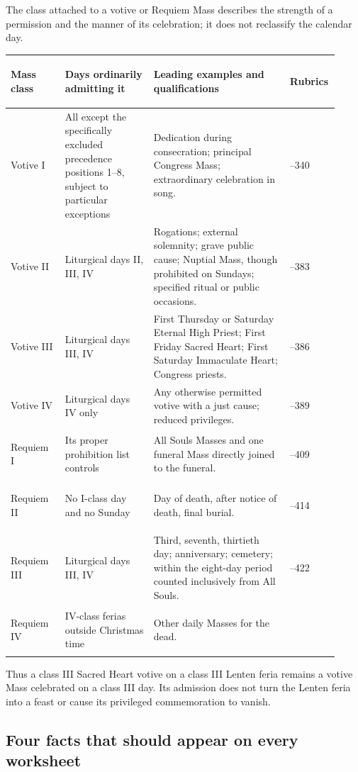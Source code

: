 The class attached to a votive or Requiem Mass describes the strength of a permission and the manner of its celebration; it does not reclassify the calendar day.

\begin{longtable}{>{\bfseries\raggedright\arraybackslash}p{0.16\linewidth}>{\raggedright\arraybackslash}p{0.26\linewidth}>{\raggedright\arraybackslash}p{0.40\linewidth}>{\raggedright\arraybackslash}p{0.10\linewidth}}
\toprule
Mass class & Days ordinarily admitting it & Leading examples and qualifications & Rubrics\\
\midrule
\endhead
Votive I & All except the specifically excluded precedence positions 1--8, subject to particular exceptions & Dedication during consecration; principal Congress Mass; extraordinary celebration in song. & 328--340\\
Votive II & Liturgical days II, III, IV & Rogations; external solemnity; grave public cause; Nuptial Mass, though prohibited on Sundays; specified ritual or public occasions. & 341--383\\
Votive III & Liturgical days III, IV & First Thursday or Saturday Eternal High Priest; First Friday Sacred Heart; First Saturday Immaculate Heart; Congress priests. & 384--386\\
Votive IV & Liturgical days IV only & Any otherwise permitted votive with a just cause; reduced privileges. & 387--389\\
Requiem I & Its proper prohibition list controls & All Souls Masses and one funeral Mass directly joined to the funeral. & 402--409\\
Requiem II & No I-class day and no Sunday & Day of death, after notice of death, final burial. & 410--414\\
Requiem III & Liturgical days III, IV & Third, seventh, thirtieth day; anniversary; cemetery; within the eight-day period counted inclusively from All Souls. & 415--422\\
Requiem IV & IV-class ferias outside Christmas time & Other daily Masses for the dead. & 423\\
\bottomrule
\end{longtable}

Thus a class III Sacred Heart votive on a class III Lenten feria remains a votive Mass celebrated on a class III day. Its admission does not turn the Lenten feria into a feast or cause its privileged commemoration to vanish.

\subsection{Four facts that should appear on every worksheet}

